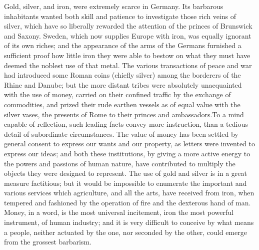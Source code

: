 Gold, silver, and iron, were extremely scarce in Germany. Its
barbarous inhabitants wanted both skill and patience to
investigate those rich veins of silver, which have so liberally
rewarded the attention of the princes of Brunswick and Saxony.
Sweden, which now supplies Europe with iron, was equally ignorant
of its own riches; and the appearance of the arms of the Germans
furnished a sufficient proof how little iron they were able to
bestow on what they must have deemed the noblest use of that
metal. The various transactions of peace and war had introduced
some Roman coins (chiefly silver) among the borderers of the
Rhine and Danube; but the more distant tribes were absolutely
unacquainted with the use of money, carried on their confined
traffic by the exchange of commodities, and prized their rude
earthen vessels as of equal value with the silver vases, the
presents of Rome to their princes and ambassadors.\footnotemark[28] To a mind
capable of reflection, such leading facts convey more
instruction, than a tedious detail of subordinate circumstances.
The value of money has been settled by general consent to express
our wants and our property, as letters were invented to express
our ideas; and both these institutions, by giving a more active
energy to the powers and passions of human nature, have
contributed to multiply the objects they were designed to
represent. The use of gold and silver is in a great measure
factitious; but it would be impossible to enumerate the important
and various services which agriculture, and all the arts, have
received from iron, when tempered and fashioned by the operation
of fire and the dexterous hand of man. Money, in a word, is the
most universal incitement, iron the most powerful instrument, of
human industry; and it is very difficult to conceive by what
means a people, neither actuated by the one, nor seconded by the
other, could emerge from the grossest barbarism.\footnotemark[29]



